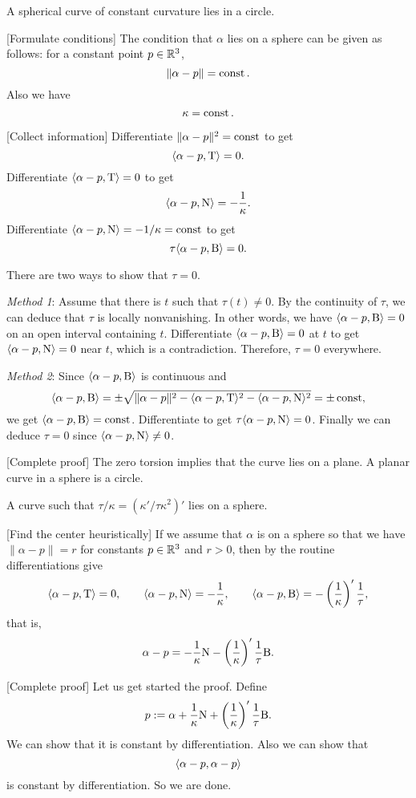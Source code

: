 \documentclass{../note}
\def\a{\alpha}
\begin{document}
\begin{prb}
A spherical curve of constant curvature lies in a circle.
\end{prb}
\begin{sol}
[Formulate conditions]
The condition that $\a$ lies on a sphere can be given as follows: for a constant point $p\in\mathbb{R}^3$,
\[\|\a-p\|=\const.\]
Also we have
\[\kappa=\operatorname{const}.\]

[Collect information]
Differentiate $\|\a-p\|^2=\const$ to get
\[\<\a-p,\rT\>=0.\]
Differentiate $\<\a-p,\rT\>=0$ to get
\[\<\a-p,\rN\>=-\frac1\kappa.\]
Differentiate $\<\a-p,\rN\>=-1/\kappa=\const$ to get
\[\tau\<\a-p,\rB\>=0.\]

There are two ways to show that $\tau=0$.

\emph{Method 1}:
Assume that there is $t$ such that $\tau(t)\ne0$.
By the continuity of $\tau$, we can deduce that $\tau$ is locally nonvanishing.
In other words, we have $\<\a-p,\rB\>=0$ on an open interval containing $t$.
Differentiate $\<\a-p,\rB\>=0$ at $t$ to get $\<\a-p,\rN\>=0$ near $t$, which is a contradiction.
Therefore, $\tau=0$ everywhere.

\emph{Method 2}:
Since $\<\a-p,\rB\>$ is continuous and
\[\<\a-p,\rB\>=\pm\sqrt{\|\a-p\|^2-\<\a-p,\rT\>^2-\<\a-p,\rN\>^2}=\pm\const,\]
we get $\<\a-p,\rB\>=\const$.
Differentiate to get $\tau\<\a-p,\rN\>=0$.
Finally we can deduce $\tau=0$ since $\<\a-p,\rN\>\ne0$.

[Complete proof]
The zero torsion implies that the curve lies on a plane.
A planar curve in a sphere is a circle.
\end{sol}

\begin{prb}
A curve such that $\tau/\kappa=(\kappa'/\tau\kappa^2)'$ lies on a sphere.
\end{prb}
\begin{sol}
[Find the center heuristically]
If we assume that $\a$ is on a sphere so that we have $\|\a-p\|=r$ for constants $p\in\mathbb{R}^3$ and $r>0$, then by the routine differentiations give
\[\<\a-p,\rT\>=0,\qquad\<\a-p,\rN\>=-\frac1\kappa,\qquad\<\a-p,\rB\>=-\left(\frac1\kappa\right)'\frac1\tau,\]
that is,
\[\a-p=-\frac1\kappa\rN-\left(\frac1\kappa\right)'\frac1\tau\rB.\]

[Complete proof]
Let us get started the proof.
Define
\[p:=\a+\frac1\kappa\rN+\left(\frac1\kappa\right)'\frac1\tau\rB.\]
We can show that it is constant by differentiation.
Also we can show that
\[\<\a-p,\a-p\>\]
is constant by differentiation.
So we are done.
\end{sol}
\end{document}
